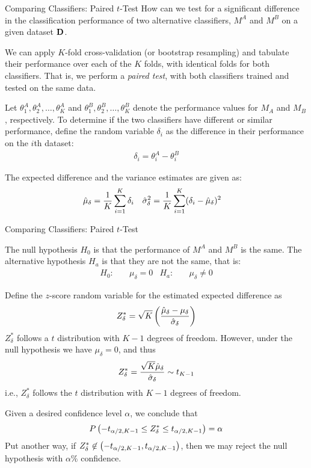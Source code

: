 \begin{frame}{Comparing Classif\/{i}ers: Paired $t$-Test}
How can we test for a signif\/{i}cant
difference in the classif\/{i}cation performance of two alternative
classif\/{i}ers, $M^A$ and $M^B$ on a given dataset $\mathbf{D}$.

\medskip
We can apply $K$-fold
cross-validation (or bootstrap resampling) and tabulate their
performance over each of the $K$ folds, with identical folds for
both classif\/{i}ers. 
That is, we perform a {\em paired test}, with
both classif\/{i}ers trained and tested on the same data. 

\medskip
Let
$\theta_1^A, \theta_2^A, \ldots, \theta_K^A$ and $\theta_1^B,
\theta_2^B, \ldots, \theta_K^B$ denote the performance values for
$M_A$ and $M_B$, respectively. To determine if the two classif\/{i}ers
have different or similar performance, def\/{i}ne the random variable $\delta_i$ as the difference in their performance on the $i$th
dataset:
\begin{align*}
  \delta_i = \theta_i^A - \theta_i^B
\end{align*}

\medskip
The expected difference and the
variance estimates are given as:
\begin{align*}
  \hat{\mu}_{\delta} &= {1\over K} \sum_{i=1}^K \delta_i &
  \hat{\sigma}^2_{\delta} &= {1\over K} \sum_{i=1}^K (\delta_i -
  \hat{\mu}_{\delta})^2
\end{align*}
\end{frame}


\begin{frame}{Comparing Classif\/{i}ers: Paired $t$-Test}
\small
  
The null hypothesis $H_0$ is that the
performance of $M^A$ and $M^B$ is the same.
The alternative hypothesis $H_a$ is that they are
not the same, that is:
\begin{align*}
  H_0\!: & \quad \mu_\delta = 0 & H_a\!: & \quad\mu_\delta \ne 0
\end{align*}

\medskip
Def\/{i}ne the $z$-score random variable for the estimated
expected difference as
\begin{align*}
  Z^*_\delta = \sqrt{K} \left( {\hat{\mu}_\delta  - \mu_\delta \over \hat{\sigma}_\delta} \right)
\end{align*}
$Z^*_\delta$ follows a $t$
distribution with $K-1$ degrees of freedom. However, under the
null hypothesis we have $\mu_\delta = 0$, and thus
\begin{align*}
  Z^*_\delta = {\sqrt{K} \hat{\mu}_\delta \over \hat{\sigma}_\delta} \sim t_{K-1}
\end{align*}
i.e., $Z^*_\delta$
follows the $t$ distribution with $K-1$ degrees of freedom.

\medskip
Given a desired conf\/{i}dence level $\alpha$, we conclude that
\begin{align*}
  P\left(-t_{\alpha/2,K-1} \le Z^*_\delta \le t_{\alpha/2,K-1}\right) =
  \alpha
\end{align*}
Put another way, if $Z^*_\delta \not\in \left(-t_{\alpha/2,K-1},
t_{\alpha/2,K-1} \right)$, then we may reject the null hypothesis
with $\alpha\%$ conf\/{i}dence. 
\end{frame}



